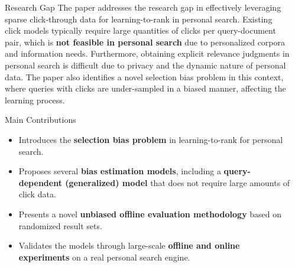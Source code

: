 \documentclass[final]{beamer}
\newlength{\sepwidth}
\newlength{\colwidth}
\newcommand{\separatorcolumn}{\begin{column}{\sepwidth}\end{column}}
\begin{document}
\begin{frame}[t]
\begin{columns}[t]
\separatorcolumn

\begin{column}{\colwidth}
  \begin{block}{Research Gap}
    The paper addresses the research gap in effectively leveraging sparse click-through data for learning-to-rank in personal search. Existing click models typically require large quantities of clicks per query-document pair, which is \textbf{not feasible in personal search} due to personalized corpora and information needs. Furthermore, obtaining explicit relevance judgments in personal search is difficult due to privacy and the dynamic nature of personal data. The paper also identifies a novel selection bias problem in this context, where queries with clicks are under-sampled in a biased manner, affecting the learning process.
  \end{block}

  \begin{block}{Main Contributions}
    \begin{itemize}
      \item Introduces the \textbf{selection bias problem} in learning-to-rank for personal search.
      \item Proposes several \textbf{bias estimation models}, including a \textbf{query-dependent (generalized) model} that does not require large amounts of click data.
      \item Presents a novel \textbf{unbiased offline evaluation methodology} based on randomized result sets.
      \item Validates the models through large-scale \textbf{offline and online experiments} on a real personal search engine.
    \end{itemize}
  \end{block}


\end{column}
\end{columns}
\end{frame}
\end{document}
